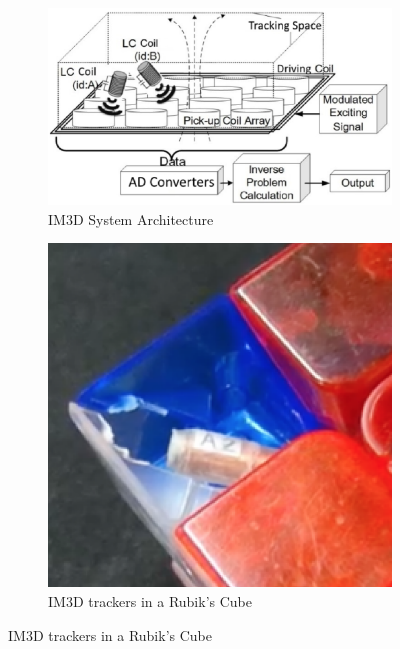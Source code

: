 \begin{figure}[h]
    \centering
    \caption{The IM3D technology as used in the Cube Harmonic}
    \label{fig:cubeharmonic-im3d}
    \begin{subfigure}{0.60\textwidth}
        \centering
        \caption{IM3D System Architecture \cite{im3d}}
        \label{fig:im3d-architecture}
        \includegraphics[width=.90\linewidth]{Figures/3 State of the Art/im3d.png}
    \end{subfigure}%
    \begin{subfigure}{0.40\textwidth}
        \centering
        \caption{IM3D trackers in a Rubik's Cube \cite{mannone-cubeharmonic-2019}}
        \label{fig:cubeharmonic-trackers}
        \includegraphics[width=.90\linewidth]{Figures/3 State of the Art/cubeharmonic-2019-tags.png}
    \end{subfigure}%
\end{figure}

